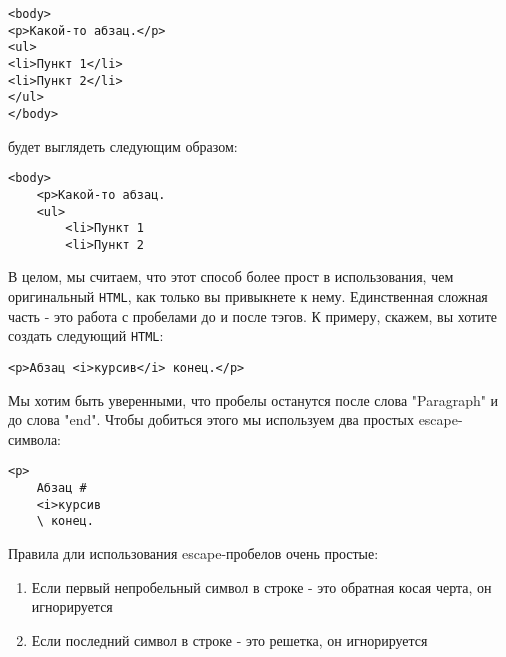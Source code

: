 \begin{lstlisting}
<body>                                                                          
<p>Какой-то абзац.</p>                                                          
<ul>                                                                            
<li>Пункт 1</li>                                                                 
<li>Пункт 2</li>                                                                 
</ul>                                                                           
</body>   
\end{lstlisting}

будет выглядеть следующим образом:
\begin{lstlisting}
<body>                                                                          
    <p>Какой-то абзац.
    <ul>                                                                        
        <li>Пункт 1                                                              
        <li>Пункт 2    
\end{lstlisting}

В целом, мы считаем, что этот способ более прост в использования, чем 
оригинальный \texttt{HTML}, как только вы привыкнете к нему. Единственная сложная часть
 - это работа с пробелами до и после тэгов. К примеру, скажем, вы хотите
создать следующий \texttt{HTML}:

\begin{lstlisting}
<p>Абзац <i>курсив</i> конец.</p>
\end{lstlisting}

Мы хотим быть уверенными, что пробелы останутся после слова "Paragraph" и
до слова "end". Чтобы добиться этого мы используем два простых escape-символа:

\begin{lstlisting}
<p>                                                                             
    Абзац #
    <i>курсив                                                    
    \ конец.         
\end{lstlisting}

Правила дли использования escape-пробелов очень простые:
\begin{enumerate}
\item Если первый непробельный символ в строке - это обратная косая черта, 
он игнорируется
\item Если последний символ в строке - это решетка, он игнорируется
\end{enumerate}

